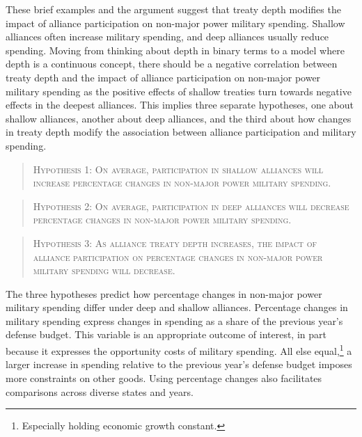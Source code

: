 \documentclass[12pt]{article}
\begin{document}
 
These brief examples and the argument suggest that treaty depth modifies the impact of alliance participation on non-major power military spending. 
Shallow alliances often increase military spending, and deep alliances usually reduce spending.  
Moving from thinking about depth in binary terms to a model where depth is a continuous concept, there should be a negative correlation between treaty depth and the impact of alliance participation on non-major power military spending as the positive effects of shallow treaties turn towards negative effects in the deepest alliances. 
This implies three separate hypotheses, one about shallow alliances, another about deep alliances, and the third about how changes in treaty depth modify the association between alliance participation and military spending. 
 

\begin{quote}
\textsc{Hypothesis 1: On average, participation in shallow alliances will increase percentage changes in non-major power military spending.}
\end{quote}

\begin{quote}
\textsc{Hypothesis 2: On average, participation in deep alliances will decrease percentage changes in non-major power military spending.}
\end{quote}

\begin{quote}
\textsc{Hypothesis 3: As alliance treaty depth increases, the impact of alliance participation on percentage changes in non-major power military spending will decrease.}
\end{quote}


The three hypotheses predict how percentage changes in non-major power military spending differ under deep and shallow alliances. 
Percentage changes in military spending express changes in spending as a share of the previous year's defense budget.
This variable is an appropriate outcome of interest, in part because it expresses the opportunity costs of military spending. 
All else equal,\footnote{Especially holding economic growth constant.} a larger increase in spending relative to the previous year's defense budget imposes more constraints on other goods. 
Using percentage changes also facilitates comparisons across diverse states and years. 
\end{document}
